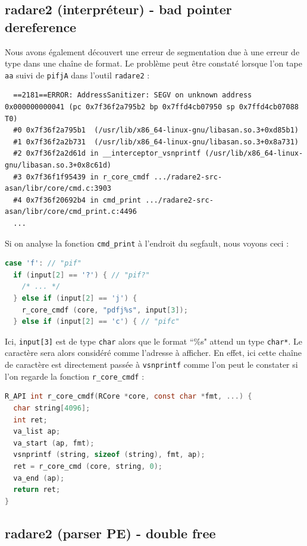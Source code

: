 \subsection{radare2 (interpréteur) - bad pointer dereference}

Nous avons également découvert une erreur de segmentation due à une erreur de type dans une chaîne de format.
Le problème peut être constaté lorsque l'on tape \lstinline{aa} suivi de \lstinline{pifjA} dans l'outil \lstinline{radare2} :

\begin{lstlisting}
  ==2181==ERROR: AddressSanitizer: SEGV on unknown address 0x000000000041 (pc 0x7f36f2a795b2 bp 0x7ffd4cb07950 sp 0x7ffd4cb07088 T0)
  #0 0x7f36f2a795b1  (/usr/lib/x86_64-linux-gnu/libasan.so.3+0xd85b1)
  #1 0x7f36f2a2b731  (/usr/lib/x86_64-linux-gnu/libasan.so.3+0x8a731)
  #2 0x7f36f2a2d61d in __interceptor_vsnprintf (/usr/lib/x86_64-linux-gnu/libasan.so.3+0x8c61d)
  #3 0x7f36f1f95439 in r_core_cmdf .../radare2-src-asan/libr/core/cmd.c:3903
  #4 0x7f36f20692b4 in cmd_print .../radare2-src-asan/libr/core/cmd_print.c:4496
  ...
\end{lstlisting}

Si on analyse la fonction \lstinline{cmd_print} à l'endroit du segfault, nous voyons ceci :

\begin{lstlisting}[language=C]
case 'f': // "pif"
  if (input[2] == '?') { // "pif?"
    /* ... */
  } else if (input[2] == 'j') {
    r_core_cmdf (core, "pdfj%s", input[3]);
  } else if (input[2] == 'c') { // "pifc"
\end{lstlisting}

Ici, \lstinline{input[3]} est de type \lstinline{char} alors que le format ``\%s" attend un type \lstinline{char*}.
Le caractère sera alors considéré comme l'adresse à afficher.
En effet, ici cette chaîne de caractère est directement passée à \lstinline{vsnprintf} comme l'on peut le constater si l'on regarde la fonction \lstinline{r_core_cmdf} :

\begin{lstlisting}[language=C]
R_API int r_core_cmdf(RCore *core, const char *fmt, ...) {
  char string[4096];
  int ret;
  va_list ap;
  va_start (ap, fmt);
  vsnprintf (string, sizeof (string), fmt, ap);
  ret = r_core_cmd (core, string, 0);
  va_end (ap);
  return ret;
}
\end{lstlisting}

\subsection{radare2 (parser PE) - double free}


